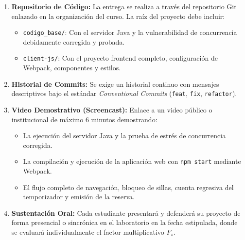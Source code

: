 \documentclass[10pt,letterpaper]{article}
\begin{document}
\begin{enumerate}[leftmargin=*]
  \item \textbf{Repositorio de Código:} La entrega se realiza a través del repositorio Git enlazado en la organización del curso. La raíz del proyecto debe incluir:
    \begin{itemize}
      \item \texttt{codigo\_base/}: Con el servidor Java y la vulnerabilidad de concurrencia debidamente corregida y probada.
      \item \texttt{client-js/}: Con el proyecto frontend completo, configuración de Webpack, componentes y estilos.
    \end{itemize}
  \item \textbf{Historial de Commits:} Se exige un historial continuo con mensajes descriptivos bajo el estándar \textit{Conventional Commits} (\texttt{feat}, \texttt{fix}, \texttt{refactor}).
  \item \textbf{Video Demostrativo (Screencast):} Enlace a un video público o institucional de máximo 6 minutos demostrando:
    \begin{itemize}
      \item La ejecución del servidor Java y la prueba de estrés de concurrencia corregida.
      \item La compilación y ejecución de la aplicación web con \texttt{npm start} mediante Webpack.
      \item El flujo completo de navegación, bloqueo de sillas, cuenta regresiva del temporizador y emisión de la reserva.
    \end{itemize}
  \item \textbf{Sustentación Oral:} Cada estudiante presentará y defenderá su proyecto de forma presencial o sincrónica en el laboratorio en la fecha estipulada, donde se evaluará individualmente el factor multiplicativo $F_s$.
\end{enumerate}
\end{document}

